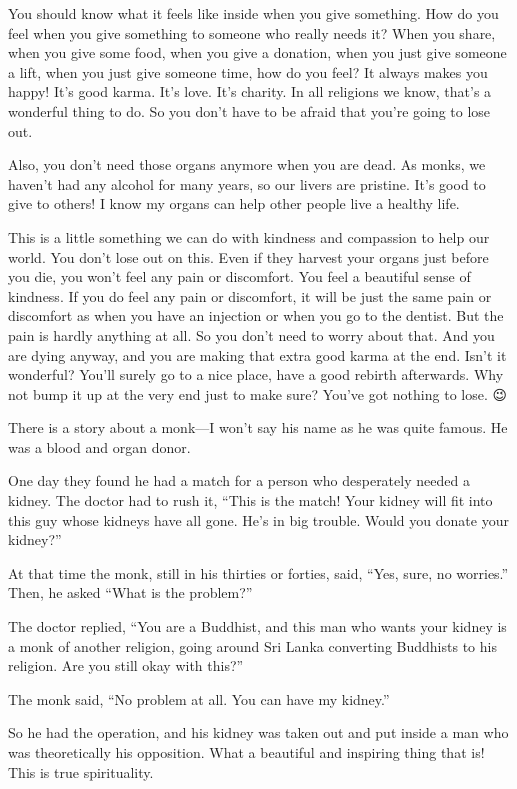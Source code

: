 \documentclass[12pt, openany]{book}
\begin{document}
You should know what it feels like inside when you give something. How do you feel when you give something to someone who really needs it? When you share, when you give some food, when you give a donation, when you just give someone a lift, when you just give someone time, how do you feel? It always makes you happy! It’s good karma. It’s love. It’s charity. In all religions we know, that’s a wonderful thing to do. So you don’t have to be afraid that you’re going to lose out. 

Also, you don’t need those organs anymore when you are dead. As monks, we haven’t had any alcohol for many years, so our livers are pristine. It’s good to give to others! I know my organs can help other people live a healthy life. 

This is a little something we can do with kindness and compassion to help our world. You don’t lose out on this. Even if they harvest your organs just before you die, you won’t feel any pain or discomfort. You feel a beautiful sense of kindness. If you do feel any pain or discomfort, it will be just the same pain or discomfort as when you have an injection or when you go to the dentist. But the pain is hardly anything at all. So you don’t need to worry about that. And you are dying anyway, and you are making that extra good karma at the end. Isn’t it wonderful? You’ll surely go to a nice place, have a good rebirth afterwards. Why not bump it up at the very end just to make sure? You’ve got nothing to lose. 😉

There is a story about a monk—I won’t say his name as he was quite famous. He was a blood and organ donor. 

One day they found he had a match for a person who desperately needed a kidney. The doctor had to rush it, “This is the match! Your kidney will fit into this guy whose kidneys have all gone. He’s in big trouble. Would you donate your kidney?” 

At that time the monk, still in his thirties or forties, said, “Yes, sure, no worries.” Then, he asked “What is the problem?” 

The doctor replied, “You are a Buddhist, and this man who wants your kidney is a monk of another religion, going around Sri Lanka converting Buddhists to his religion. Are you still okay with this?” 

The monk said, “No problem at all. You can have my kidney.” 

So he had the operation, and his kidney was taken out and put inside a man who was theoretically his opposition. What a beautiful and inspiring thing that is! This is true spirituality. 
\end{document}
